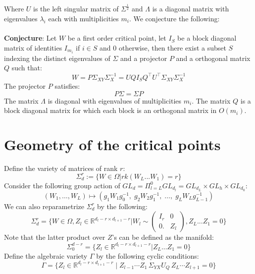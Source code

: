 \documentclass{article}
\theoremstyle{definition}
\begin{document}
Where $U$ is the left singular matrix of $\Sigma^{\frac{1}{2}}$ and $\Lambda$ is a diagonal matrix with eigenvalues $\lambda_i$ each with multiplicities $m_i$. We conjecture the following:
\\
\\
\textbf{Conjecture}: Let $W$ be a first order critical point, let $I_S$ be a block diagonal matrix of identities $I_{m_i}$ if $i\in S$ and $0$ otherwise, then there exist a subset $S$ indexing the distinct eigenvalues of $\Sigma$ and a projector $P$ and a orthogonal matrix $Q$ such that:
\begin{equation*}
    W = P\Sigma_{XY}\Sigma_{X}^{-1} = U Q I_S Q^{\top}U^{\top}\Sigma_{XY}\Sigma_{X}^{-1}
\end{equation*}
The projector $P$ satisfies:
\begin{equation*}
    P\Sigma = \Sigma P
\end{equation*}
The matrix $\Lambda$ is diagonal with eigenvalues of multiplicities $m_i$.
The matrix $Q$ is a block diagonal matrix for which each block is an orthogonal matrix in $O(m_i)$.
\section{Geometry of the critical points}
Define the variety of matrices of rank $r$:
\begin{equation*}
    \Sigma^r_d := \{W\in\Omega|rk(W_L...W_1) = r\}
\end{equation*}
Consider the following group action of $GL_d=\Pi_{l=L}^0 GL_{d_l} = GL_{d_L}\times GL_{h} \times GL_{d_0}$:
\begin{equation*}
    (W_1,\dots,W_L)\mapsto (g_1W_1g_0^{-1},\; g_2W_2g_1^{-1},\;\dots,\; g_L W_L g_{L-1}^{-1})
\end{equation*}
We can also reparametrize $\Sigma^r_d$ by the following:
\begin{equation*}
    \Sigma^r_d = \{W\in \Omega, Z_l\in\mathbb{R}^{d_l-r\times d_{l+1}-r}| W_l \sim \begin{pmatrix} I_r & 0 \\
                                                      0.  & Z_l      
                                        \end{pmatrix}, Z_L...Z_1= 0\}
\end{equation*}
Note that the latter product over $Z$'s can be defined as the manifold:
\begin{equation*}
    \Sigma_0^{d -r} = \{Z_l\in\mathbb{R}^{d_l-r\times d_{l+1}-r}| Z_L...Z_1= 0\}
\end{equation*}
Define the algebraic variety $\Gamma$ by the following cyclic conditions:
\begin{equation*}
    \Gamma =\{Z_l\in\mathbb{R}^{d_l-r\times d_{l+1}-r}\mid Z_{l-1}\cdots Z_1\,\Sigma_{YX}U_Q\,Z_L\cdots Z_{l+1} = 0\}
\end{equation*}
\end{document}
